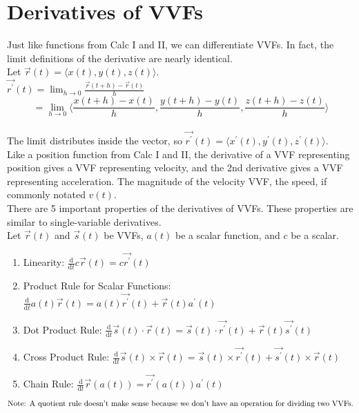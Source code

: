 \section{Derivatives of VVFs}
\noindent
Just like functions from Calc I and II, we can differentiate VVFs. In fact, the limit definitions of the derivative are nearly identical.\\
Let $\vec{r}(t)=\langle x(t), y(t), z(t) \rangle$.\\
$\vec{r^\prime}(t)=\lim_{h\to 0}{\frac{\vec{r}(t+h)-\vec{r}(t)}{h}}$\\
$$=\lim_{h\to 0}{\langle \frac{x(t+h)-x(t)}{h}, \frac{y(t+h)-y(t)}{h}, \frac{z(t+h)-z(t)}{h} \rangle}$$\\
The limit distributes inside the vector, so $\vec{r^\prime}(t)=\langle x^{\prime}(t), y^{\prime}(t), z^{\prime}(t) \rangle$.\\

\noindent
Like a position function from Calc I and II, the derivative of a VVF representing position gives a VVF representing velocity, and the 2nd derivative gives a VVF representing acceleration. The magnitude of the velocity VVF, the speed, if commonly notated $v(t)$.\\

\noindent
There are 5 important properties of the derivatives of VVFs. These properties are similar to single-variable derivatives.\\
Let $\vec{r}(t)$ and $\vec{s}(t)$ be VVFs, $a(t)$ be a scalar function, and $c$ be a scalar.\\
\begin{enumerate}
	\item Linearity: $\frac{\mathrm{d}}{\mathrm{d}t}c\vec{r}(t)=c\vec{r^\prime}(t)$
	\item Product Rule for Scalar Functions: $\frac{\mathrm{d}}{\mathrm{d}t}a(t)\vec{r}(t)=a(t)\vec{r^\prime}(t)+\vec{r}(t)a^{\prime}(t)$
	\item Dot Product Rule: $\frac{\mathrm{d}}{\mathrm{d}t}\vec{s}(t)\cdot\vec{r}(t)=\vec{s}(t)\cdot\vec{r^\prime}(t)+\vec{r}(t)\vec{s^\prime}(t)$
	\item Cross Product Rule: $\frac{\mathrm{d}}{\mathrm{d}t}\vec{s}(t)\times\vec{r}(t)=\vec{s}(t)\times\vec{r^\prime}(t)+\vec{s^\prime}(t)\times\vec{r}(t)$
	\item Chain Rule: $\frac{\mathrm{d}}{\mathrm{d}t}\vec{r}(a(t))=\vec{r^\prime}(a(t))a^{\prime}(t)$
\end{enumerate}
$\small{\text{Note: A quotient rule doesn't make sense because we don't have an operation for dividing two VVFs.}}$

